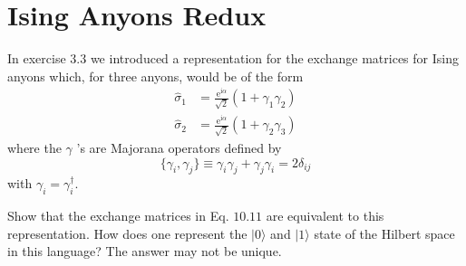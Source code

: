 \section{Ising Anyons Redux}
In exercise $3.3$ we introduced a representation for the exchange matrices for Ising anyons which, for three anyons, would be of the form
\begin{equation*}
\begin{aligned}
\hat{\sigma }_{1} & =\frac{\mathrm{e}^{\mathrm{i} \alpha }}{\sqrt{2}}( 1+\gamma _{1} \gamma _{2})\\
\hat{\sigma }_{2} & =\frac{\mathrm{e}^{\mathrm{i} \alpha }}{\sqrt{2}}( 1+\gamma _{2} \gamma _{3})
\end{aligned}
\end{equation*}
where the $\gamma $ 's are Majorana operators defined by
\begin{equation*}
\{\gamma _{i} ,\gamma _{j}\} \equiv \gamma _{i} \gamma _{j} +\gamma _{j} \gamma _{i} =2\delta _{ij}
\end{equation*}
with $\gamma _{i} =\gamma _{i}^{\dagger }$.

Show that the exchange matrices in Eq. $10.11$ are equivalent to this representation. How does one represent the $|0\rangle $ and $|1\rangle $ state of the Hilbert space in this language? The answer may not be unique.

